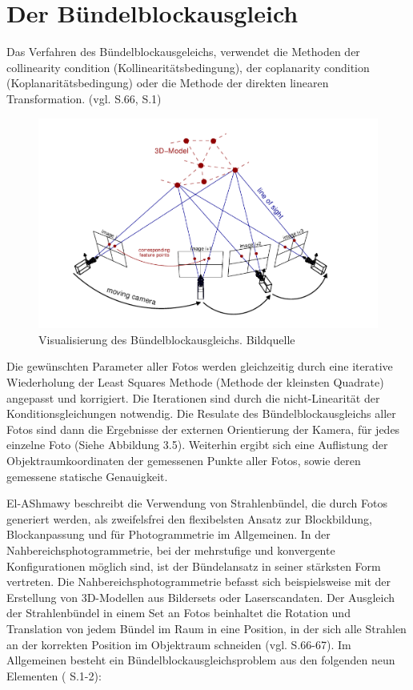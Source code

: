 \section{Der Bündelblockausgleich}

Das Verfahren des Bündelblockausgeleichs, verwendet die Methoden der \glqq collinearity condition \grqq{} (Kollinearitätsbedingung), der \glqq coplanarity condition\grqq{} (Koplanaritätsbedingung) oder die Methode der direkten linearen Transformation. (vgl. \cite{comparative_conditions_study} S.66, \cite{coll_exterior} S.1)

\begin{figure}[H]
	\centering
	\includegraphics[scale=0.55]{bundle.png}
	\caption{Visualisierung des Bündelblockausgleichs. Bildquelle \cite{efficient_bundle}}
\end{figure}

Die gewünschten Parameter aller Fotos werden gleichzeitig durch eine iterative Wiederholung der \glqq Least Squares\grqq{} Methode (Methode der kleinsten Quadrate) angepasst und korrigiert. 
Die Iterationen sind durch die nicht-Linearität der Konditionsgleichungen notwendig. Die Resulate des Bündelblockausgleichs aller Fotos sind dann die Ergebnisse der externen Orientierung der Kamera, für jedes einzelne Foto (Siehe Abbildung 3.5). Weiterhin ergibt sich eine Auflistung der Objektraumkoordinaten der gemessenen Punkte aller Fotos, sowie deren gemessene statische Genauigkeit. 

El-AShmawy \cite{comparative_conditions_study} beschreibt die Verwendung von Strahlenbündel, die durch Fotos generiert werden, als zweifelsfrei den flexibelsten Ansatz zur Blockbildung, Blockanpassung und für Photogrammetrie im Allgemeinen. In der Nahbereichsphotogrammetrie, bei der mehrstufige und konvergente Konfigurationen möglich sind, ist der Bündelansatz in seiner stärksten Form vertreten. Die Nahbereichsphotogrammetrie befasst sich beispielsweise mit der Erstellung von 3D-Modellen aus Bildersets oder Laserscandaten. Der Ausgleich der Strahlenbündel in einem Set an Fotos beinhaltet die Rotation und Translation von jedem Bündel im Raum in eine Position, in der sich alle Strahlen an der korrekten Position im Objektraum schneiden (vgl. \cite{comparative_conditions_study} S.66-67). Im Allgemeinen besteht ein Bündelblockausgleichsproblem aus den folgenden neun Elementen (\cite{bundle_adjustment} S.1-2):

